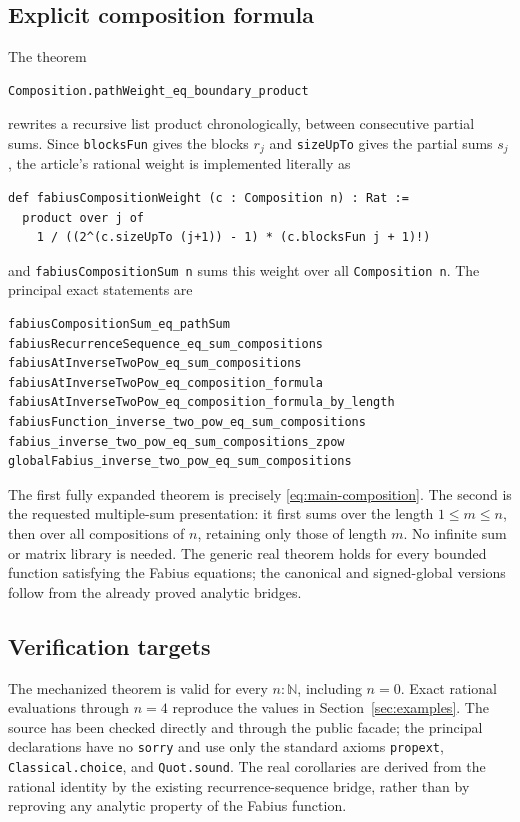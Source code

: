 \documentclass[11pt]{article}
\theoremstyle{definition}
\theoremstyle{remark}
\newcommand{\N}{\mathbb{N}}
\begin{document}
\subsection*{Explicit composition formula}

The theorem
\begin{verbatim}
Composition.pathWeight_eq_boundary_product
\end{verbatim}
rewrites a recursive list product chronologically, between consecutive
partial sums.
Since \verb|blocksFun| gives the blocks $r_j$ and \verb|sizeUpTo| gives the
partial sums $s_j$, the article's rational weight is implemented literally
as
\begin{verbatim}
def fabiusCompositionWeight (c : Composition n) : Rat :=
  product over j of
    1 / ((2^(c.sizeUpTo (j+1)) - 1) * (c.blocksFun j + 1)!)
\end{verbatim}
and \verb|fabiusCompositionSum n| sums this weight over all
\verb|Composition n|.  The principal exact statements are
\begin{verbatim}
fabiusCompositionSum_eq_pathSum
fabiusRecurrenceSequence_eq_sum_compositions
fabiusAtInverseTwoPow_eq_sum_compositions
fabiusAtInverseTwoPow_eq_composition_formula
fabiusAtInverseTwoPow_eq_composition_formula_by_length
fabiusFunction_inverse_two_pow_eq_sum_compositions
fabius_inverse_two_pow_eq_sum_compositions_zpow
globalFabius_inverse_two_pow_eq_sum_compositions
\end{verbatim}
The first fully expanded theorem is precisely \eqref{eq:main-composition}.
The second is the requested multiple-sum presentation: it first sums over
the length $1\leq m\leq n$, then over all compositions of $n$, retaining
only those of length $m$.  No infinite sum or matrix library is needed.
The generic real theorem holds for every bounded function satisfying the
Fabius equations; the canonical and signed-global versions follow from the
already proved analytic bridges.

\subsection*{Verification targets}

The mechanized theorem is valid for every $n:\N$, including $n=0$.
Exact rational evaluations through $n=4$ reproduce the values in
Section~\ref{sec:examples}.  The source has been checked directly and through
the public facade; the principal declarations have no \verb|sorry| and use
only the standard axioms \verb|propext|, \verb|Classical.choice|, and
\verb|Quot.sound|.  The real corollaries are derived from the rational
identity by the existing recurrence-sequence bridge, rather than by
reproving any analytic property of the Fabius function.
\end{document}
